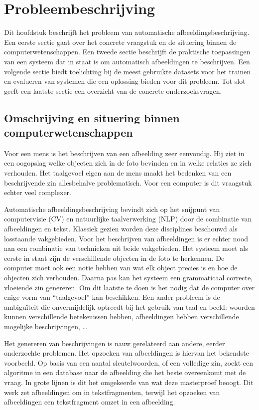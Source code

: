 \chapter{Probleembeschrijving}
\label{chap:Probleembeschrijving}
Dit hoofdstuk beschrijft het probleem van automatische afbeeldingsbeschrijving. Een eerste sectie gaat over het concrete vraagstuk en de situering binnen de computerwetenschappen. Een tweede sectie beschrijft de praktische toepassingen van een systeem dat in staat is om automatisch afbeeldingen te beschrijven. Een volgende sectie biedt toelichting bij de meest gebruikte datasets voor het trainen en evalueren van systemen die een oplossing bieden voor dit probleem. Tot slot geeft een laatste sectie een overzicht van de concrete onderzoeksvragen.

\section{Omschrijving en situering binnen computerwetenschappen}
\label{sec:Omschrijving en situering}
Voor een mens is het beschrijven van een afbeelding zeer eenvoudig. Hij ziet in een oogopslag welke objecten zich in de foto bevinden en in welke relaties ze zich verhouden. Het taalgevoel eigen aan de mens maakt het bedenken van een beschrijvende zin allesbehalve problematisch.
Voor een computer is dit vraagstuk echter veel complexer.

Automatische afbeeldingsbeschrijving bevindt zich op het snijpunt van computervisie (CV) en natuurlijke taalverwerking (NLP) door de combinatie van afbeeldingen en tekst. Klassiek gezien worden deze disciplines beschouwd als losstaande vakgebieden. Voor het beschrijven van afbeeldingen is er echter nood aan een combinatie van technieken uit beide vakgebieden. Het systeem moet als eerste in staat zijn de verschillende objecten in de foto te herkennen. De computer moet ook een notie hebben van wat elk object precies is en hoe de objecten zich verhouden. Daarna pas kan het systeem een grammaticaal correcte, vloeiende zin genereren. Om dit laatste te doen is het nodig dat de computer over enige vorm van ``taalgevoel'' kan beschikken. Een ander probleem is de ambigu\"iteit die onvermijdelijk optreedt bij het gebruik van taal en beeld: woorden kunnen verschillende betekenissen hebben, afbeeldingen hebben verschillende mogelijke beschrijvingen, \ldots

Het genereren van beschrijvingen is nauw gerelateerd aan andere, eerder onderzochte problemen. Het opzoeken van afbeeldingen is hiervan het bekendste voorbeeld. Op basis van een aantal sleutelwoorden, of een volledige zin, zoekt een algoritme in een database naar de afbeelding die het beste overeenkomt met de vraag. In grote lijnen is dit het omgekeerde van wat deze masterproef beoogt. Dit werk zet afbeeldingen om in tekstfragmenten, terwijl het opzoeken van afbeeldingen een tekstfragment omzet in een afbeelding.


